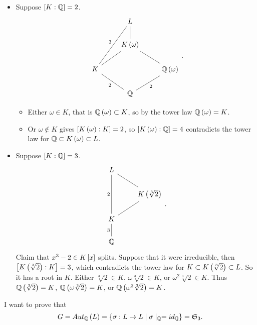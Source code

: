 \begin{itemize}
\item Suppose $ \sb{K : \Q} = 2 $.
$$
\begin{tikzcd}
& L & \\
& K\rb{\omega} \arrow[dash]{u} & \\
K \arrow[dash]{uur}{3} \arrow[dash]{ur} & & \Q\rb{\omega} \arrow[dash]{ul} \\
& \Q \arrow[dash]{ul}{2} \arrow[dash, swap]{ur}{2} &
\end{tikzcd}.
$$
\begin{itemize}
\item Either $ \omega \in K $, that is $ \Q\rb{\omega} \subset K $, so by the tower law $ \Q\rb{\omega} = K $.
\item Or $ \omega \notin K $ gives $ \sb{K\rb{\omega} : K} = 2 $, so $ \sb{K\rb{\omega} : \Q} = 4 $ contradicts the tower law for $ \Q \subset K\rb{\omega} \subset L $.
\end{itemize}
\item Suppose $ \sb{K : \Q} = 3 $.
$$
\begin{tikzcd}
L & \\
& K\rb{\sqrt[3]{2}} \arrow[dash]{ul} \\
K \arrow[dash]{uu}{2} \arrow[dash]{ur} & \\
\Q \arrow[dash]{u}{3} &
\end{tikzcd}.
$$
Claim that $ x^3 - 2 \in K\sb{x} $ splits. Suppose that it were irreducible, then $ \sb{K\rb{\sqrt[3]{2}} : K} = 3 $, which contradicts the tower law for $ K \subset K\rb{\sqrt[3]{2}} \subset L $. So it has a root in $ K $. Either $ \sqrt[3]{2} \in K $, $ \omega\sqrt[3]{2} \in K $, or $ \omega^2\sqrt[3]{2} \in K $. Thus $ \Q\rb{\sqrt[3]{2}} = K $, $ \Q\rb{\omega\sqrt[3]{2}} = K $, or $ \Q\rb{\omega^2\sqrt[3]{2}} = K $.
\end{itemize}
I want to prove that
$$ G = Aut_\Q\rb{L} = \cb{\sigma : L \to L \mid \sigma \mid_\Q = id_\Q} = \mathfrak{S}_3. $$


